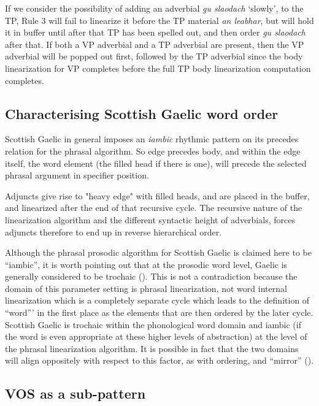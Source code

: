 \documentclass[output=paper,colorlinks,citecolor=brown]{langscibook}
\begin{document}
If we consider the possibility of adding an adverbial \textit{gu slaodach} `slowly', to the TP, Rule 3 will fail to linearize it before the TP material \textit{an leabhar}, but will hold it in buffer until after that TP has been spelled out, and then order \textit{gu slaodach} after that.  If both a VP adverbial and a TP adverbial are present, then the VP adverbial will be popped out first, followed by the TP adverbial since the body linearization for VP completes before the full TP body linearization computation completes. 
 
\subsection{Characterising Scottish Gaelic word order}
 
Scottish Gaelic  in general imposes  an \textit{iambic} rhythmic pattern on its precedes relation for the phrasal algorithm.  So edge precedes body, and within the edge itself, the word element (the filled head if there is one), will precede the selected phrasal argument in specifier position. 

Adjuncts give rise to "heavy edge" with filled heads, and are placed in the buffer, and linearized after the end of that recursive cycle. The recursive nature of the linearization algorithm and the different syntactic height of adverbials, forces adjuncts therefore  to end up in reverse hierarchical order. 

Although the phrasal prosodic algorithm for Scottish Gaelic is claimed here to be “iambic”, it is worth pointing out that at the prosodic word level, Gaelic is generally considered to be trochaic (\citealt{morrison19}). This is not a contradiction because the domain of this parameter setting is phrasal linearization, not word internal linearization which is a completely separate cycle which leads to the definition of ``word''' in the first place as the elements that are then ordered by the later cycle. Scottish Gaelic is trochaic within the phonological word domain and iambic (if the word is even appropriate at these higher levels of abstraction) at the level of the phrasal linearization algorithm. It is possible in fact that the two domains will align oppositely with respect to this factor, as with ordering, and “mirror” (\citealt{brody00}). 

\subsection{VOS as a sub-pattern}
\end{document}
